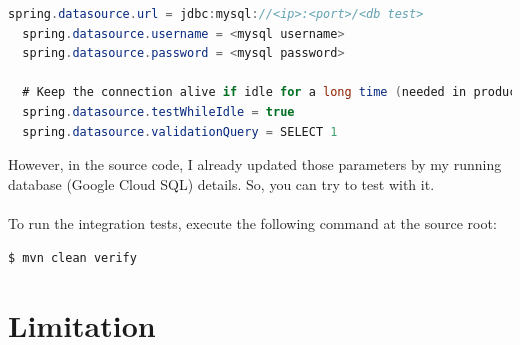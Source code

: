 \documentclass[a4paper,12pt]{article}
\begin{document}
\begin{lstlisting}[language=java]
  spring.datasource.url = jdbc:mysql://<ip>:<port>/<db test>
  spring.datasource.username = <mysql username>
  spring.datasource.password = <mysql password>

  # Keep the connection alive if idle for a long time (needed in production)
  spring.datasource.testWhileIdle = true
  spring.datasource.validationQuery = SELECT 1
\end{lstlisting}
However, in the source code, I already updated those parameters by my running database (Google Cloud SQL) details. So, you can try to test with it.
\\
\\
To run the integration tests, execute the following command at the source root:
\\
\begin{lstlisting}[language=bash]
  $ mvn clean verify
\end{lstlisting}

\section{Limitation}
\end{document}
